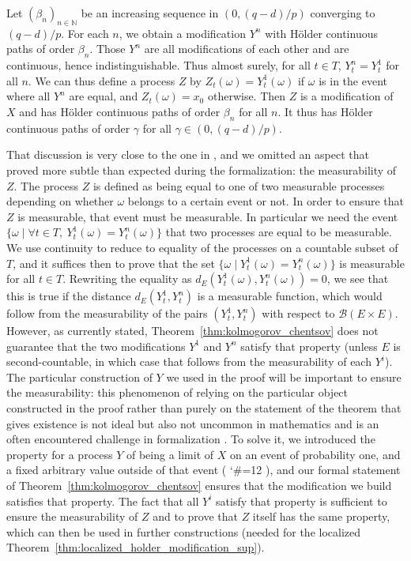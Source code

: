 \documentclass[lean]{Draft}
\makeatletter
\newcommand\leanlink{\begingroup\catcode`\#=12\relax\@leanlink}
\newcommand\@leanlink[2]{\endgroup
\href{#1}
{\texttt{\detokenize{#2}}}}
\newcommand{\docs}[1]{%
\leanlink{https://remydegenne.github.io/brownian-motion/docs/find/?pattern=#1\#doc}
{#1}}
\makeatother
\begin{document}
Let $(\beta_n)_{n \in \mathbb{N}}$ be an increasing sequence in $(0, (q - d)/p)$ converging to $(q - d)/p$.
For each $n$, we obtain a modification $Y^n$ with Hölder continuous paths of order $\beta_n$.
Those $Y^n$ are all modifications of each other and are continuous, hence indistinguishable.
Thus almost surely, for all $t \in T$, $Y^n_t = Y^1_t$ for all $n$.
We can thus define a process $Z$ by $Z_t(\omega) = Y^1_t(\omega)$ if $\omega$ is in the event where all $Y^n$ are equal, and $Z_t(\omega) = x_0$ otherwise.
Then $Z$ is a modification of $X$ and has Hölder continuous paths of order $\beta_n$ for all $n$.
It thus has Hölder continuous paths of order $\gamma$ for all $\gamma \in (0, (q - d)/p)$.

That discussion is very close to the one in \cite{kratschmer2023kolmogorov}, and we omitted an aspect that proved more subtle than expected during the formalization: the measurability of $Z$.
The process $Z$ is defined as being equal to one of two measurable processes depending on whether $\omega$ belongs to a certain event or not.
In order to ensure that $Z$ is measurable, that event must be measurable.
In particular we need the event $\{\omega \mid \forall t \in T, \: Y_t^1(\omega) = Y_t^n(\omega)\}$ that two processes are equal to be measurable.
We use continuity to reduce to equality of the processes on a countable subset of $T$, and it suffices then to prove that the set $\{\omega \mid Y_t^1(\omega) = Y_t^n(\omega)\}$ is measurable for all $t \in T$.
Rewriting the equality as $d_E(Y_t^1(\omega), Y_t^n(\omega)) = 0$, we see that this is true if the distance $d_E(Y_t^1, Y_t^n)$ is a measurable function, which would follow from the measurability of the pairs $(Y_t^1, Y_t^n)$ with respect to $\mathcal{B}(E \times E)$.
However, as currently stated, Theorem~\ref{thm:kolmogorov_chentsov} does not guarantee that the two modifications $Y^1$ and $Y^n$ satisfy that property (unless $E$ is second-countable, in which case that follows from the measurability of each $Y^i$).
The particular construction of $Y$ we used in the proof will be important to ensure the measurability: this phenomenon of relying on the particular object constructed in the proof rather than purely on the statement of the theorem that gives existence is not ideal but also not uncommon in mathematics and is an often encountered challenge in formalization \cite{morelTalk}.
To solve it, we introduced the property for a process $Y$ of being a limit of $X$ on an event of probability one, and a fixed arbitrary value outside of that event (\docs{ProbabilityTheory.IsLimitOfIndicator}), and our formal statement of Theorem~\ref{thm:kolmogorov_chentsov} ensures that the modification we build satisfies that property.
The fact that all $Y^i$ satisfy that property is sufficient to ensure the measurability of $Z$ and to prove that $Z$ itself has the same property, which can then be used in further constructions (needed for the localized Theorem~\ref{thm:localized_holder_modification_sup}).
\end{document}

